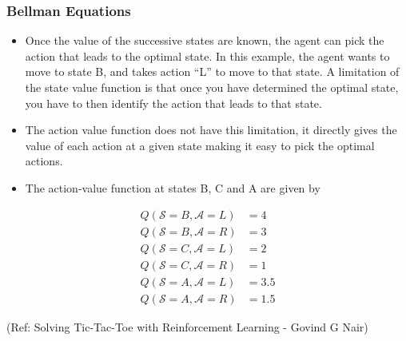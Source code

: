 \begin{frame}[fragile]\frametitle{Bellman Equations}



\begin{itemize}
\item Once the value of the successive states are known, the agent can pick the action that leads to the optimal state. In this example, the agent wants to move to state B, and takes action “L” to move to that state. A limitation of the state value function is that once you have determined the optimal state, you have to then identify the action that leads to that state.
\item The action value function does not have this limitation, it directly gives the value of each action at a given state making it easy to pick the optimal actions.
\item The action-value function at states B, C and A are given by
\end{itemize}


\begin{align*}
Q(\mathcal{S}=B,\mathcal{A}=L) &= 4\\
Q(\mathcal{S}=B,\mathcal{A}=R) &= 3\\
Q(\mathcal{S}=C,\mathcal{A}=L) &= 2\\
Q(\mathcal{S}=C,\mathcal{A}=R) &= 1\\
Q(\mathcal{S}=A,\mathcal{A}=L) &= 3.5\\
Q(\mathcal{S}=A,\mathcal{A}=R) &= 1.5
\end{align*}


{\tiny (Ref: Solving Tic-Tac-Toe with Reinforcement Learning - Govind G Nair)}

\end{frame}


